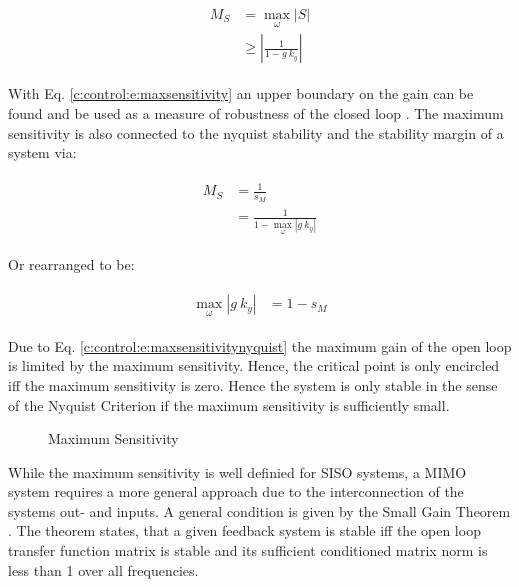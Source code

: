 \begin{align}
\begin{split}
M_S & = \max_\omega \left| S \right| \\
& \geq \left| \frac{1}{1 - g~k_y}\right|
\end{split}
\label{c:control:e:maxsensitivity}
\end{align}

With Eq. \ref{c:control:e:maxsensitivity} an upper boundary on the gain can be found and be used as a measure of robustness of the closed loop \cite[p.323 ff.]{Astrom2009FeedbackEngineers}. The maximum sensitivity is also connected to the nyquist stability and the stability margin of a system via:

\begin{align}
\begin{split}
M_S &= \frac{1}{s_M} \\
&= \frac{1}{1 - \max_\omega \left| g ~k_y \right|}
\end{split}
\label{c:control:e:maxsensitivitynyquist}
\end{align}

Or rearranged to be:

\begin{align}
\begin{split}
\max_\omega \left| g~k_y\right| &= 1 - s_M
\end{split}
\end{align}

Due to Eq. \ref{c:control:e:maxsensitivitynyquist} the maximum gain of the open loop is limited by the maximum sensitivity. Hence, the critical point is only encircled iff the maximum sensitivity is zero. Hence the system is only stable in the sense of the Nyquist Criterion if the maximum sensitivity is sufficiently small.\\

\begin{figure}[H]
\begin{minipage}[b]{\textwidth}
\centering

\caption{Maximum Sensitivity}
\label{c:control:f:MaximumSensitivity}
\end{minipage}
\end{figure}


While the maximum sensitivity is well definied for SISO systems, a MIMO system requires a more general approach due to the interconnection of the systems out- and inputs. A general condition is given by the Small Gain Theorem \cite[p.150 ff.]{Skogestad2005MultivariableDesign}. The theorem states, that a given feedback system is stable iff the open loop transfer function matrix is stable and its sufficient conditioned matrix norm is less than 1 over all frequencies.


